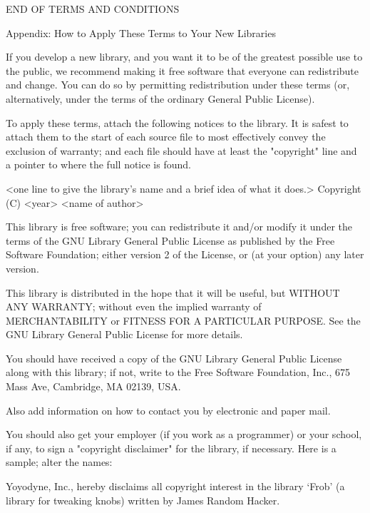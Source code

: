 \documentclass[twoside]{tceusermanual}
\begin{document}
\begin{center}
END OF TERMS AND CONDITIONS
\end{center}

\begin{center}
Appendix: How to Apply These Terms to Your New Libraries
\end{center}

If you develop a new library, and you want it to be of the
greatest possible use to the public, we recommend making it free
software that everyone can redistribute and change.  You can do
so by permitting redistribution under these terms (or,
alternatively, under the terms of the ordinary General Public
License).

To apply these terms, attach the following notices to the
library.  It is safest to attach them to the start of each
source file to most effectively convey the exclusion of
warranty; and each file should have at least the "copyright"
line and a pointer to where the full notice is found.

    <one line to give the library's name and a brief idea of what it does.>
    Copyright (C) <year>  <name of author>

    This library is free software; you can redistribute it and/or
    modify it under the terms of the GNU Library General Public
    License as published by the Free Software Foundation; either
    version 2 of the License, or (at your option) any later version.

    This library is distributed in the hope that it will be useful,
    but WITHOUT ANY WARRANTY; without even the implied warranty of
    MERCHANTABILITY or FITNESS FOR A PARTICULAR PURPOSE.  See the GNU
    Library General Public License for more details.

    You should have received a copy of the GNU Library General Public
    License along with this library; if not, write to the Free
    Software Foundation, Inc., 675 Mass Ave, Cambridge, MA 02139, USA.

Also add information on how to contact you by electronic and paper mail.

You should also get your employer (if you work as a programmer) or your
school, if any, to sign a "copyright disclaimer" for the library, if
necessary.  Here is a sample; alter the names:

  Yoyodyne, Inc., hereby disclaims all copyright interest in the
  library `Frob' (a library for tweaking knobs) written by James Random Hacker.
\end{document}
